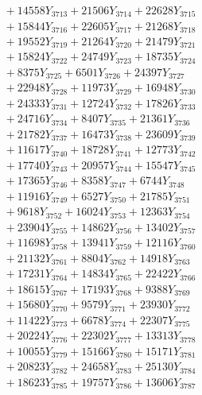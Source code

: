 \documentclass[a4paper,10pt]{article}
\begin{document}
{\begin{align}
&\;  + 14558 Y_{3713} + 21506 Y_{3714} + 22628 Y_{3715} \\[0.3ex]
&\;  + 15844 Y_{3716} + 22605 Y_{3717} + 21268 Y_{3718} \\[0.5ex]\allowbreak
&\;  + 19552 Y_{3719} + 21264 Y_{3720} + 21479 Y_{3721} \\[0.3ex]
&\;  + 15824 Y_{3722} + 24749 Y_{3723} + 18735 Y_{3724} \\[0.3ex]
&\;  + 8375 Y_{3725} + 6501 Y_{3726} + 24397 Y_{3727} \\[0.3ex]
&\;  + 22948 Y_{3728} + 11973 Y_{3729} + 16948 Y_{3730} \\[0.3ex]
&\;  + 24333 Y_{3731} + 12724 Y_{3732} + 17826 Y_{3733} \\[0.3ex]
&\;  + 24716 Y_{3734} + 8407 Y_{3735} + 21361 Y_{3736} \\[0.3ex]
&\;  + 21782 Y_{3737} + 16473 Y_{3738} + 23609 Y_{3739} \\[0.3ex]
&\;  + 11617 Y_{3740} + 18728 Y_{3741} + 12773 Y_{3742} \\[0.3ex]
&\;  + 17740 Y_{3743} + 20957 Y_{3744} + 15547 Y_{3745} \\[0.3ex]
&\;  + 17365 Y_{3746} + 8358 Y_{3747} + 6744 Y_{3748} \\[0.5ex]\allowbreak
&\;  + 11916 Y_{3749} + 6527 Y_{3750} + 21785 Y_{3751} \\[0.3ex]
&\;  + 9618 Y_{3752} + 16024 Y_{3753} + 12363 Y_{3754} \\[0.3ex]
&\;  + 23904 Y_{3755} + 14862 Y_{3756} + 13402 Y_{3757} \\[0.3ex]
&\;  + 11698 Y_{3758} + 13941 Y_{3759} + 12116 Y_{3760} \\[0.3ex]
&\;  + 21132 Y_{3761} + 8804 Y_{3762} + 14918 Y_{3763} \\[0.3ex]
&\;  + 17231 Y_{3764} + 14834 Y_{3765} + 22422 Y_{3766} \\[0.3ex]
&\;  + 18615 Y_{3767} + 17193 Y_{3768} + 9388 Y_{3769} \\[0.3ex]
&\;  + 15680 Y_{3770} + 9579 Y_{3771} + 23930 Y_{3772} \\[0.3ex]
&\;  + 11422 Y_{3773} + 6678 Y_{3774} + 22307 Y_{3775} \\[0.3ex]
&\;  + 20224 Y_{3776} + 22302 Y_{3777} + 13313 Y_{3778} \\[0.5ex]\allowbreak
&\;  + 10055 Y_{3779} + 15166 Y_{3780} + 15171 Y_{3781} \\[0.3ex]
&\;  + 20823 Y_{3782} + 24658 Y_{3783} + 25130 Y_{3784} \\[0.3ex]
&\;  + 18623 Y_{3785} + 19757 Y_{3786} + 13606 Y_{3787} \\[0.3ex]

\end{align}}
\end{document}
